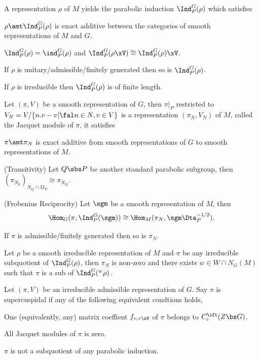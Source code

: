 \documentclass[a4paper, twoside]{article}
\begin{document}
\begin{thm}[{\cite[4.1]{PR2008}}]
	A representation $\rho$ of $M$ yields the parabolic induction $\Ind_{P}^{G}(\rho)$ which satisfies
	\begin{enr}
		\item $\rho\amt\Ind_{P}^{G}(\rho)$ is exact additive between the categories of smooth representations of $M$ and $G$.
		\item $\Ind_{P}^{G}(\rho)=\ind_{P}^{G}(\rho)$ and $\Ind_{P}^{G}(\rho\xV)\cong\Ind_{P}^{G}(\rho)\xV$.
		\item If $\rho$ is unitary/admissible/finitely generated then so is $\Ind_{P}^{G}(\rho)$.
		\item If $\rho$ is irreducible then $\Ind_{P}^{G}(\rho)$ is of finite length.
	\end{enr}
\end{thm}

\begin{thm}[{\cite[5.1, 5.3]{PR2008}}]
	Let $(\pi,V)$ be a smooth representation of $G$, then $\pi|_{P}$ restricted to $V_{N}=V/\{n.v-v|\fal n\in N, v\in V\}$ is a representation $(\pi_{N},V_{N})$ of $M$, called the Jacquet module of $\pi$, it satisfies
	\begin{enr}
		\item $\pi\amt\pi_{N}$ is exact additive from smooth representations of $G$ to smooth representations of $M$.
		\item (Transitivity) Let $Q\sbs P$ be another standard parabolic subgroup, then $(\pi_{N_{p}})_{N_{Q}\cap M_{P}}\cong\pi_{N_{Q}}$.
		\item (Frobenius Reciprocity) Let $\sgm$ be a smooth representation of $M$, then
		\[
			\Hom_{G}(\pi,\Ind_{P}^{G}(\sgm))\cong\Hom_{M}(\pi_{N},\sgm\Dta_{P}^{-1/2}).
		\]
		\item If $\pi$ is admissible/finitely generated then so is $\pi_{N}$.
	\end{enr}
\end{thm}

\begin{thm}[{\cite[5.9, 5.10]{PR2008}}]
	Let $\rho$ be a smooth irreducible representation of $M$ and $\pi$ be any irreducible subquotient of $\Ind_{P}^{G}(\rho)$, then $\pi_{N}$ is non-zero and there exists $w\in W\cap N_{G}(M)$ such that $\pi$ is a sub of $\Ind_{P}^{G}({}^{w}\rho)$.
\end{thm}

\begin{thm}[{\cite[6.1]{PR2008}}]
	Let $(\pi,V)$ be an irreducible admissible representation of $G$. Say $\pi$ is supercuspidal if any of the following equivalent condtions holds,
	\begin{enr}
		\item One (equivalently, any) matrix coeffient $f_{v,v\xV}$ of $\pi$ belongs to $C_{c}^{\ift}(Z\bs G)$.
		\item All Jacquet modules of $\pi$ is zero.
		\item $\pi$ is not a subquotient of any parabolic induction.
	\end{enr}
\end{thm}
\end{document}
